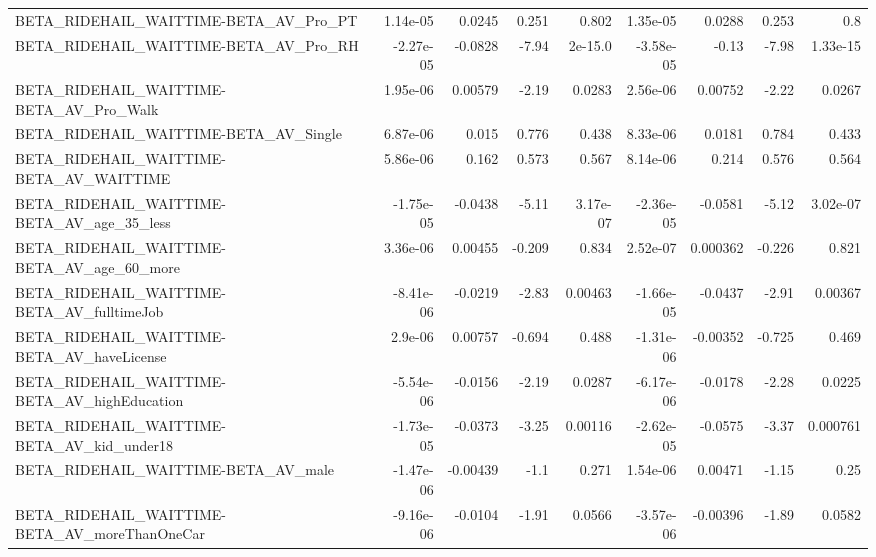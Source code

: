 \begin{tabular}{lrrrrrrrr}
BETA\_RIDEHAIL\_WAITTIME-BETA\_AV\_Pro\_PT              &    1.14e-05 &       0.0245 &    0.251 &    0.802 &   1.35e-05 &      0.0288 &        0.253 &           0.8 \\
BETA\_RIDEHAIL\_WAITTIME-BETA\_AV\_Pro\_RH              &   -2.27e-05 &      -0.0828 &    -7.94 &  2e-15.0 &  -3.58e-05 &       -0.13 &        -7.98 &      1.33e-15 \\
BETA\_RIDEHAIL\_WAITTIME-BETA\_AV\_Pro\_Walk            &    1.95e-06 &      0.00579 &    -2.19 &   0.0283 &   2.56e-06 &     0.00752 &        -2.22 &        0.0267 \\
BETA\_RIDEHAIL\_WAITTIME-BETA\_AV\_Single              &    6.87e-06 &        0.015 &    0.776 &    0.438 &   8.33e-06 &      0.0181 &        0.784 &         0.433 \\
BETA\_RIDEHAIL\_WAITTIME-BETA\_AV\_WAITTIME            &    5.86e-06 &        0.162 &    0.573 &    0.567 &   8.14e-06 &       0.214 &        0.576 &         0.564 \\
BETA\_RIDEHAIL\_WAITTIME-BETA\_AV\_age\_35\_less         &   -1.75e-05 &      -0.0438 &    -5.11 & 3.17e-07 &  -2.36e-05 &     -0.0581 &        -5.12 &      3.02e-07 \\
BETA\_RIDEHAIL\_WAITTIME-BETA\_AV\_age\_60\_more         &    3.36e-06 &      0.00455 &   -0.209 &    0.834 &   2.52e-07 &    0.000362 &       -0.226 &         0.821 \\
BETA\_RIDEHAIL\_WAITTIME-BETA\_AV\_fulltimeJob         &   -8.41e-06 &      -0.0219 &    -2.83 &  0.00463 &  -1.66e-05 &     -0.0437 &        -2.91 &       0.00367 \\
BETA\_RIDEHAIL\_WAITTIME-BETA\_AV\_haveLicense         &     2.9e-06 &      0.00757 &   -0.694 &    0.488 &  -1.31e-06 &    -0.00352 &       -0.725 &         0.469 \\
BETA\_RIDEHAIL\_WAITTIME-BETA\_AV\_highEducation       &   -5.54e-06 &      -0.0156 &    -2.19 &   0.0287 &  -6.17e-06 &     -0.0178 &        -2.28 &        0.0225 \\
BETA\_RIDEHAIL\_WAITTIME-BETA\_AV\_kid\_under18         &   -1.73e-05 &      -0.0373 &    -3.25 &  0.00116 &  -2.62e-05 &     -0.0575 &        -3.37 &      0.000761 \\
BETA\_RIDEHAIL\_WAITTIME-BETA\_AV\_male                &   -1.47e-06 &     -0.00439 &     -1.1 &    0.271 &   1.54e-06 &     0.00471 &        -1.15 &          0.25 \\
BETA\_RIDEHAIL\_WAITTIME-BETA\_AV\_moreThanOneCar      &   -9.16e-06 &      -0.0104 &    -1.91 &   0.0566 &  -3.57e-06 &    -0.00396 &        -1.89 &        0.0582 \\

\end{tabular}
